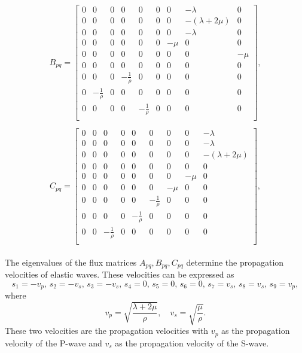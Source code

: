 \begin{align}
    \begin{split}
    B_{pq} = 
        \begin{bmatrix}
        0 & 0 & 0 & 0 & 0 & 0 & 0 & -\lambda & 0 \\
        0 & 0 & 0 & 0 & 0 & 0 & 0 & -\left(\lambda + 2\mu\right) & 0 \\
        0 & 0 & 0 & 0 & 0 & 0 & 0 & -\lambda & 0 \\
        0 & 0 & 0 & 0 & 0 & 0 & -\mu & 0 & 0 \\
        0 & 0 & 0 & 0 & 0 & 0 & 0 & 0 & -\mu \\
        0 & 0 & 0 & 0 & 0 & 0 & 0 & 0 & 0 \\
        0 & 0 & 0 & -\frac{1}{\rho} & 0 & 0 & 0 & 0 & 0 \\
        0 & -\frac{1}{\rho} & 0 & 0 & 0 & 0 & 0 & 0 & 0 \\
        0 & 0 & 0 & 0 & -\frac{1}{\rho} & 0 & 0 & 0 & 0 \\
    \end{bmatrix},
    \end{split}
    \label{eq:fluxmatrixB}
\end{align}
\begin{align}
    \begin{split}
    C_{pq} = 
        \begin{bmatrix}
        0 & 0 & 0 & 0 & 0 & 0 & 0 & 0 & -\lambda \\
        0 & 0 & 0 & 0 & 0 & 0 & 0 & 0 & -\lambda \\
        0 & 0 & 0 & 0 & 0 & 0 & 0 & 0 & -\left(\lambda + 2\mu\right) \\
        0 & 0 & 0 & 0 & 0 & 0 & 0 & 0 & 0 \\
        0 & 0 & 0 & 0 & 0 & 0 & 0 & -\mu & 0 \\
        0 & 0 & 0 & 0 & 0 & 0 & -\mu & 0 & 0 \\
        0 & 0 & 0 & 0 & 0 & -\frac{1}{\rho} & 0 & 0 & 0 \\
        0 & 0 & 0 & 0 & -\frac{1}{\rho} & 0 & 0 & 0 & 0 \\
        0 & 0 & -\frac{1}{\rho} & 0 & 0 & 0 & 0 & 0 & 0 \\
    \end{bmatrix},
    \end{split}
    \label{eq:fluxmatrixC}
\end{align}

The eigenvalues of the flux matrices $A_{pq}, B_{pq}, C_{pq}$ determine the propagation velocities of elastic waves. These velocities can be expressed as
\begin{equation}
    s_1 = -v_p, \, s_2 = -v_s, \, s_3 = -v_s, \, s_4=0, \, s_5 = 0, \, s_6 = 0, \, s_7 = v_s, \, s_8 = v_s, \, s_9 = v_p,
\end{equation}
where
\begin{equation}
    v_p = \sqrt{\frac{\lambda + 2\mu}{\rho}}, \quad v_s = \sqrt{\frac{\mu}{\rho}}.
    \label{eq:wavevelocities}
\end{equation}
These two velocities are the propagation velocities with $v_p$ as the propagation velocity of the P-wave and $v_s$ as the propagation velocity of the S-wave.

